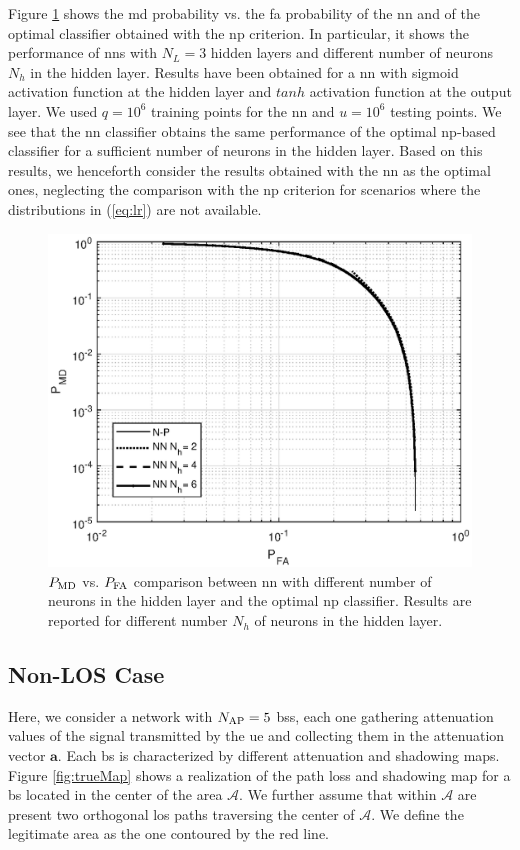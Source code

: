 \documentclass[twocolumns]{IEEEtran}
\begin{document}
Figure \ref{fig:NP_comp} shows the \ac{md} probability vs. the \ac{fa} probability of the \ac{nn} and of the optimal classifier obtained with the  \ac{np} criterion. In particular, it shows the performance of \acp{nn} with $N_L=3$ hidden layers and different number of neurons $N_h$ in the hidden layer. Results have been obtained for a \ac{nn} with sigmoid activation function at the hidden layer and $tanh$ activation function at the output layer. We used $q=10^6$ training points for the \ac{nn} and $u=10^6$ testing points. We see that the \ac{nn} classifier obtains the same performance of the optimal \ac{np}-based classifier for a sufficient number of neurons in the hidden layer. Based on this results, we henceforth consider the results obtained with the \ac{nn} as the optimal ones, neglecting the comparison with the \ac{np} criterion for scenarios where the distributions in (\ref{eq:lr}) are not available.

 \begin{figure}[h]
     \centering
     \includegraphics[width=1\columnwidth]{FA_MD_LOS.eps}
     \caption{$P_{\rm MD}$ vs. $P_{\rm FA}$ comparison between \ac{nn} with different number of neurons in the hidden layer and the optimal \ac{np} classifier. Results are reported for different number $N_h$ of neurons in the hidden layer.}
     \label{fig:NP_comp}
 \end{figure}


\subsection{Non-LOS Case}
Here, we consider a network with $N_{\rm AP}=5$ \acp{bs}, each one gathering attenuation values of the signal transmitted by the \ac{ue} and collecting them in the attenuation vector $\bm{a}$. Each \ac{bs} is characterized by different attenuation and shadowing maps. Figure \ref{fig:trueMap} shows a realization of the path loss and shadowing map for a \ac{bs} located in the center of the area $\mathcal{A}$. We further assume that within $\mathcal{A}$ are present two orthogonal \ac{los} paths traversing the center of $\mathcal{A}$. We define the legitimate area as the one contoured by the red line.
\end{document}
